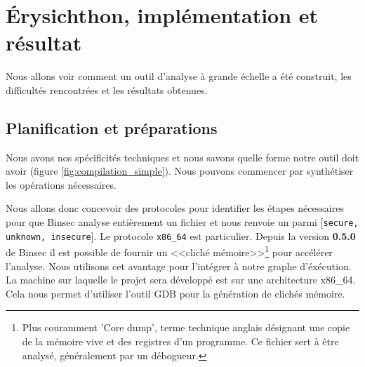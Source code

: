 \chapter{Érysichthon, implémentation et résultat}
\label{chap:erysichtonUsage}

Nous allons voir comment un outil d'analyse à grande échelle a été construit, les difficultés rencontrées et les résultats obtenues.  

\section{Planification et préparations}

Nous avons nos spécificités techniques et nous savons quelle forme notre outil doit avoir (figure \ref{fig:compilation_simple}). Nous pouvons commencer par synthétiser les opérations nécessaires.\smallbreak

Nous allons donc concevoir des protocoles pour identifier les étapes nécessaires pour que Binsec analyse entièrement un fichier et nous renvoie un parmi [\texttt{secure, unknown, insecure}]. Le protocole \texttt{x86\_64} est particulier. Depuis la version \textbf{0.5.0} de Binsec il est possible de fournir un <<cliché mémoire>>\footnote{Plus couramment 'Core dump', terme technique anglais désignant une copie de la mémoire vive et des registres d'un programme. Ce fichier sert à être analysé, généralement par un débogueur.} pour accélérer l'analyse. Nous utilisons cet avantage pour l'intégrer à notre graphe d'éxécution. La machine sur laquelle le projet sera développé est sur une architecture x86\_64. Cela nous permet d'utiliser l'outil GDB pour la génération de clichés mémoire.\medbreak

